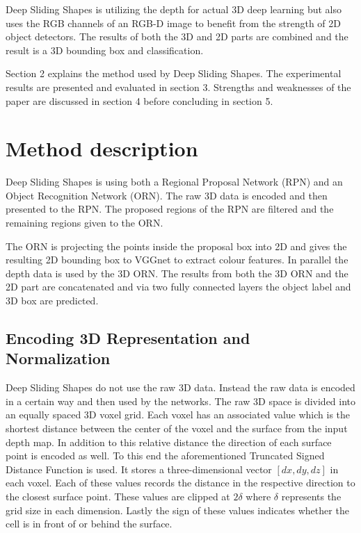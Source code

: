 \documentclass[12pt]{scrartcl}
\begin{document}
Deep Sliding Shapes\cite{Song2016} is utilizing the depth for actual 3D deep
learning but also uses the RGB channels of an RGB-D image to benefit from the
strength of 2D object detectors. The results of both the 3D and 2D parts are
combined and the result is a 3D bounding box and classification.

Section 2 explains the method used by Deep Sliding Shapes. The experimental
results are presented and evaluated in section 3. Strengths and weaknesses
of the paper are discussed in section 4 before concluding in section 5.

\section{Method description}

Deep Sliding Shapes\cite{Song2016} is using both a Regional Proposal Network (RPN)
and an Object Recognition Network (ORN). The raw 3D data is encoded and then
presented to the RPN. The proposed regions of the RPN are filtered and the remaining
regions given to the ORN.

The ORN is projecting the points inside the proposal box into 2D and gives the
resulting 2D bounding box to VGGnet\cite{Simonyan2015} to extract colour
features. In parallel the depth data is used by the 3D ORN. The results from both
the 3D ORN and the 2D part are concatenated and via two fully connected layers
the object label and 3D box are predicted.

\subsection{Encoding 3D Representation and Normalization}

Deep Sliding Shapes do not use the raw 3D data. Instead the raw data is
encoded in a certain way and then used by the networks. The raw 3D space
is divided into an equally spaced 3D voxel grid. Each voxel has an associated
value which is the shortest distance between the center of the voxel and
the surface from the input depth map. In addition to this relative distance
the direction of each surface point is encoded as well. To this end the
aforementioned Truncated Signed Distance Function is used. It stores a
three-dimensional vector \([dx, dy, dz]\) in each voxel. Each of these
values records the distance in the respective direction to the closest
surface point. These values are clipped at \(2\delta\) where \(\delta\) represents
the grid size in each dimension. Lastly the sign of these values indicates
whether the cell is in front of or behind the surface.
\end{document}
